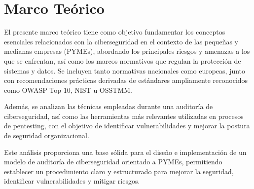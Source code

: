 \documentclass[a4paper, 10pt]{article}
\begin{document}
\clearpage































\section{Marco Teórico}

El presente marco teórico tiene como objetivo fundamentar los conceptos esenciales relacionados con la ciberseguridad en el contexto de las pequeñas y medianas empresas (PYMEs), abordando los principales riesgos y amenazas a los que se enfrentan, así como los marcos normativos que regulan la protección de sistemas y datos. Se incluyen tanto normativas nacionales como europeas, junto con recomendaciones prácticas derivadas de estándares ampliamente reconocidos como OWASP Top 10, NIST u OSSTMM.

\par\vspace{0.5cm}

Además, se analizan las técnicas empleadas durante una auditoría de ciberseguridad, así como las herramientas más relevantes utilizadas en procesos de pentesting, con el objetivo de identificar vulnerabilidades y mejorar la postura de seguridad organizacional.
\par\vspace{0.5cm}

Este análisis proporciona una base sólida para el diseño e implementación de un modelo de auditoría de ciberseguridad orientado a PYMEs, permitiendo establecer un procedimiento claro y estructurado para mejorar la seguridad, identificar vulnerabilidades y mitigar riesgos.
\end{document}

